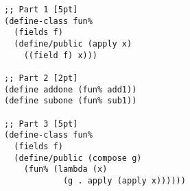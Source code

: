 \documentclass[12pt]{article}                   %
\newenvironment{solution}{}{}
\begin{document}
\begin{problem}
\begin{solution}
\begin{verbatim}
;; Part 1 [5pt]
(define-class fun%
  (fields f)
  (define/public (apply x)
    ((field f) x)))

;; Part 2 [2pt]
(define addone (fun% add1))
(define subone (fun% sub1))

;; Part 3 [5pt]
(define-class fun%
  (fields f)
  (define/public (compose g)
    (fun% (lambda (x)
            (g . apply (apply x))))))
\end{verbatim}

\end{solution}

\newpage
\ifrubric{}
\newpage
\fi

\end{problem}
\end{document}

